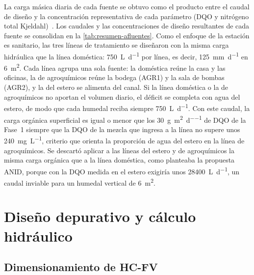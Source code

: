 La carga másica diaria de cada fuente se obtuvo como el producto entre el caudal de diseño y la concentración representativa de cada parámetro (DQO y nitrógeno total Kjeldahl)~\parencite{tchobanoglous2014wastewater}.
Los caudales y las concentraciones de diseño resultantes de cada fuente se consolidan en la \cref{tab:resumen-afluentes}.
Como el enfoque de la estación es sanitario, las tres líneas de tratamiento se diseñaron con la misma carga hidráulica que la línea doméstica: \qty{750}{\liter\per\day} por línea, es decir, \qty{125}{\milli\meter\per\day} en \qty{6}{\square\meter}.
Cada línea agrupa una sola fuente: la doméstica reúne la casa y las oficinas, la de agroquímicos reúne la bodega (AGR1) y la sala de bombas (AGR2), y la del estero se alimenta del canal.
Si la línea doméstica o la de agroquímicos no aportan el volumen diario, el déficit se completa con agua del estero, de modo que cada humedal reciba siempre \qty{750}{\liter\per\day}.
Con este caudal, la carga orgánica superficial es igual o menor que los \qty{30}{\gram\per\square\meter\per\day} de DQO de la Fase~1 siempre que la DQO de la mezcla que ingresa a la línea no supere unos \qty{240}{\milli\gram\per\liter}, criterio que orienta la proporción de agua del estero en la línea de agroquímicos.
Se descartó aplicar a las líneas del estero y de agroquímicos la misma carga orgánica que a la línea doméstica, como planteaba la propuesta ANID, porque con la DQO medida en el estero exigiría unos \qty{28400}{\liter\per\day}, un caudal inviable para un humedal vertical de \qty{6}{\square\meter}.

\section{Diseño depurativo y cálculo hidráulico}
\label{sec:met-hidraulico}

\subsection{Dimensionamiento de HC-FV}

